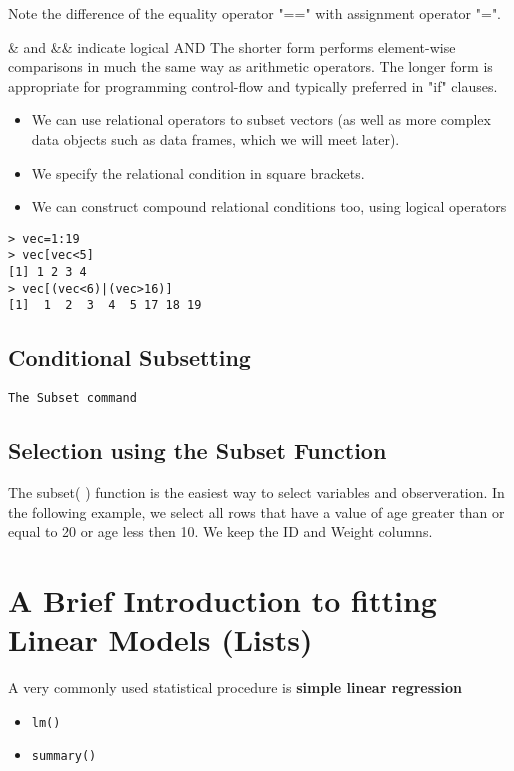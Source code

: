 \documentclass[a4paper,12pt]{article}
\begin{document}
Note the difference of the equality operator "==" with assignment operator "=".

\& and \&\& indicate logical AND %
The shorter form performs element-wise comparisons in much the same way as arithmetic operators. The longer form is appropriate for programming control-flow and typically preferred in "if" clauses.
\begin{itemize}
\item We can use relational operators to subset vectors (as well as more complex data objects such as data frames, which we will meet later).
\item We specify the  relational condition in square brackets.
\item We can construct compound relational conditions too, using logical operators
\end{itemize}
\begin{framed}
\begin{verbatim}
> vec=1:19
> vec[vec<5]
[1] 1 2 3 4
> vec[(vec<6)|(vec>16)]
[1]  1  2  3  4  5 17 18 19
\end{verbatim}
\end{framed}

\subsection{Conditional Subsetting}
 \texttt{The Subset command}
\subsection{Selection using the Subset Function}
The subset( ) function is the easiest way to select variables and observeration. In the following example, we select all rows that have a value of age greater than or equal to 20 or age less then 10. We keep the ID and Weight columns.





\section{A Brief Introduction to fitting Linear Models (Lists)}

A very commonly used statistical procedure is \textbf{simple linear regression}
\begin{itemize}
\item \texttt{lm()}
\item \texttt{summary()}
\end{itemize}
\end{document}
